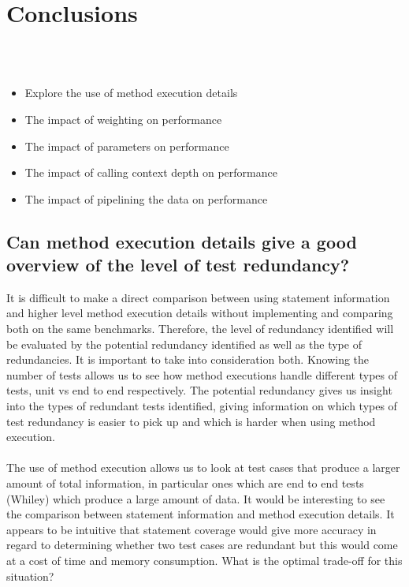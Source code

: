 \section{Conclusions}

 \\
 \\


\begin{itemize}
\item{Explore the use of method execution details}
\item{The impact of weighting on performance}
\item{The impact of parameters on performance}
\item{The impact of calling context depth on performance}
\item{The impact of pipelining the data on performance}
\end{itemize}

\subsection{Can method execution details give a good overview of the level of test redundancy?}

It is difficult to make a direct comparison between using statement information and higher level method execution details without implementing and comparing both on the same benchmarks. Therefore, the level of redundancy identified will be evaluated by the potential redundancy identified as well as the type of redundancies. It is important to take into consideration both. Knowing the number of tests allows us to see how method executions handle different types of tests, unit vs end to end respectively. The potential redundancy gives us insight into the types of redundant tests identified, giving information on which types of test redundancy is easier to pick up and which is harder when using method execution.
\paragraph{}
The use of method execution allows us to look at test cases that produce a larger amount of total information, in particular ones which are end to end tests (Whiley) which produce a large amount of data. It would be interesting to see the comparison between statement information and method execution details. It appears to be intuitive that statement coverage would give more accuracy in regard to determining whether two test cases are redundant but this would come at a cost of time and memory consumption. What is the optimal trade-off for this situation? 
